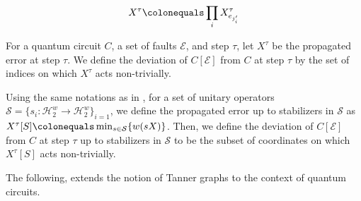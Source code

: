 \begin{definition}
  \begin{equation*}
    \begin{split}
      X^{\tau} \colonequals \prod_{i} X_{e_{j^{\prime}_{i}}}^{\tau} 
    \end{split}
  \end{equation*}
\end{definition}


\begin{definition}[Deviation]
  \label{def:deviation}
  For a quantum circuit $C$, a set of faults $\mathcal{E}$, and step $\tau$, let $X^{\tau}$ be the propagated error at step $\tau$. We define the deviation of $C[\mathcal{E}]$ from $C$ at step $\tau$ by the set of indices on which $X^{\tau}$ acts non-trivially. 
\end{definition}
\begin{definition}
  Using the same notations as in , for a set of unitary operators $\mathcal{S} = \{s_{i} \colon \mathcal{H}_{2}^{w} \rightarrow \mathcal{H}_{2}^{w} \}_{i=1}$, we define the propagated error up to stabilizers in $\mathcal{S}$ as $X^{\tau}[S] \colonequals \min_{s \in \mathcal{S}} \{ w(sX) \}$. Then, we define the deviation of $C[\mathcal{E}]$ from $C$ at step $\tau$ up to stabilizers in $\mathcal{S}$ to be the subset of coordinates on which $X^{\tau}[S]$ acts non-trivially.
\end{definition}

The following, extends the notion of Tanner graphs to the context of quantum circuits. 


